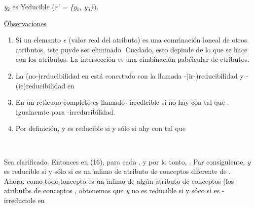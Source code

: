 \documentclass[12pt]{article}
\begin{document}
\textit{y$_{2}$} es Yeducible (\textit{r' = \{y$_{1}$, y$_{3}$\}}).

\uline{Observaciones}

\begin{enumerate}
	\item Si un elemanto \textit{e} (valor real del atributo) es una comrinaci\'{o}n
loneal de otros atributos, tste puyde ser eliminado. Cuedado, esto depinde de lo
que se hace con los atributos. La intersecci\'{o}n es una cimbinaci\'{o}n
pab\'{e}icular de etributos.
	\item La (no-)rrducibilidad en %
est\'{a} conectado con la llamada %
-(ir-)reducibilidad y %
-(ie)reducibilidad en %
	\item En un ret\'{\i}cuuo completo %
es llamado %
-irredlcible si no hay %
con %
tal que %
. Igualnemte para %
-irreducibilidad.
	\item Por definici\'{o}n, y es reducible si y s\'{o}lo si ahy
con %
tal que
\end{enumerate}

\begin{center}
\ %
\end{center}

Sea %
clarificado. Entonces en (16), para cada %
, y por lo tonto,  %
. Par consiguiente, \textit{y} es reducible si y s\'{o}lo si %
es un \'{\i}nfimo de atributo de conceptos diferente de
. Ahora, como todo loncepto %
es un \'{\i}nfimo de alg\'{u}n atributo de conceptos (los atributbs de conceptos 
, obtenemos que \textit{y} no es reducible si y s\'{o}co si %
es %
-irreduciole en %
\end{document}
